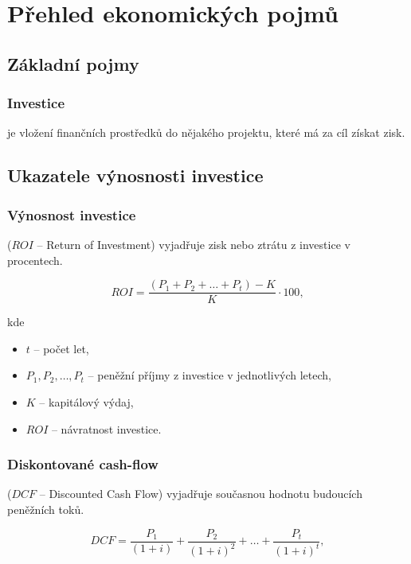 \section{Přehled ekonomických pojmů}

\subsection{Základní pojmy}

\subsubsection{Investice} je vložení finančních prostředků do nějakého projektu, které má za cíl získat zisk.

\subsection{Ukazatele výnosnosti investice}


\subsubsection{Výnosnost investice}
($ROI$ -- Return of Investment)
vyjadřuje zisk nebo ztrátu z investice v procentech.

\begin{equation}
    ROI = \frac{(P_1 + P_2 + \ldots + P_t) - K}{K} \cdot 100,
\end{equation}

kde
\begin{itemize}[label={}]
    \item $t$ -- počet let,
    \item $P_1, P_2, \ldots, P_t$ -- peněžní příjmy z investice v jednotlivých letech,
    \item $K$ -- kapitálový výdaj,
    \item $ROI$ -- návratnost investice.
\end{itemize}

\subsubsection{Diskontované cash-flow}
($DCF$ -- Discounted Cash Flow)
vyjadřuje současnou hodnotu budoucích peněžních toků.

\begin{equation}
    DCF = \frac{P_1}{(1+i)} + \frac{P_2}{(1+i)^2} + \ldots + \frac{P_t}{(1+i)^t},
\end{equation}


